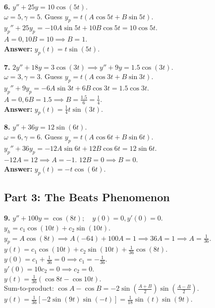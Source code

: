 \documentclass[11pt]{article}
\begin{document}
\vspace{0.5cm}
\textbf{6.} $y'' + 25y = 10 \cos(5t)$. \\
$\omega = 5, \gamma = 5$. Guess $y_p = t(A \cos 5t + B \sin 5t)$. \\
$y_p'' + 25y_p = -10A \sin 5t + 10B \cos 5t = 10 \cos 5t$. \\
$A = 0, 10B = 10 \implies B = 1$. \\
\textbf{Answer:} $y_p(t) = t \sin(5t)$.

\vspace{0.5cm}
\textbf{7.} $2y'' + 18y = 3 \cos(3t) \implies y'' + 9y = 1.5 \cos(3t)$. \\
$\omega = 3, \gamma = 3$. Guess $y_p = t(A \cos 3t + B \sin 3t)$. \\
$y_p'' + 9y_p = -6A \sin 3t + 6B \cos 3t = 1.5 \cos 3t$. \\
$A = 0, 6B = 1.5 \implies B = \frac{1.5}{6} = \frac{1}{4}$. \\
\textbf{Answer:} $y_p(t) = \frac{1}{4} t \sin(3t)$.

\vspace{0.5cm}
\textbf{8.} $y'' + 36y = 12 \sin(6t)$. \\
$\omega = 6, \gamma = 6$. Guess $y_p = t(A \cos 6t + B \sin 6t)$. \\
$y_p'' + 36y_p = -12A \sin 6t + 12B \cos 6t = 12 \sin 6t$. \\
$-12A = 12 \implies A = -1$. $12B = 0 \implies B = 0$. \\
\textbf{Answer:} $y_p(t) = -t \cos(6t)$.

\subsection*{Part 3: The Beats Phenomenon}

\textbf{9.} $y'' + 100y = \cos(8t); \quad y(0) = 0, y'(0) = 0$. \\
$y_h = c_1 \cos(10t) + c_2 \sin(10t)$. \\
$y_p = A \cos(8t) \implies A(-64) + 100A = 1 \implies 36A = 1 \implies A = \frac{1}{36}$. \\
$y(t) = c_1 \cos(10t) + c_2 \sin(10t) + \frac{1}{36} \cos(8t)$. \\
$y(0) = c_1 + \frac{1}{36} = 0 \implies c_1 = -\frac{1}{36}$. \\
$y'(0) = 10c_2 = 0 \implies c_2 = 0$. \\
$y(t) = \frac{1}{36}(\cos 8t - \cos 10t)$. \\
Sum-to-product: $\cos A - \cos B = -2 \sin(\frac{A+B}{2}) \sin(\frac{A-B}{2})$. \\
$y(t) = \frac{1}{36} \left[ -2 \sin(9t) \sin(-t) \right] = \frac{1}{18} \sin(t) \sin(9t)$.
\end{document}
